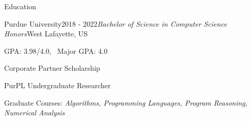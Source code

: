 \documentclass{resume} %
\begin{document}
 

\vspace{-6.0em}
\begin{rSection}{Education}

\begin{rSubsection}{Purdue University}{2018 - 2022}{\textit{Bachelor of Science in Computer Science Honors}}{West Lafayette, US}
\item GPA: 3.98/4.0, \ Major GPA: 4.0
\item Corporate Partner Scholarship
\item PurPL Undergraduate Researcher
\item Graduate Courses: \it Algorithms, Programming Languages,
Program Reasoning, Numerical Analysis
\end{rSubsection}

\end{rSection}

\end{document}
